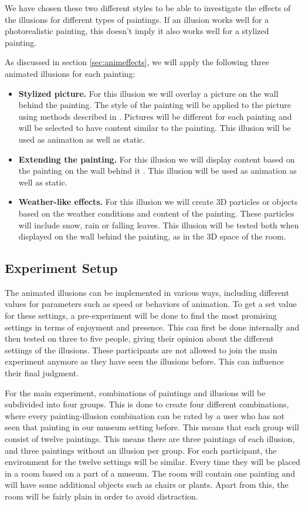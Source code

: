 \documentclass[a4paper]{article}
\begin{document}
We have chosen these two different styles to be able to investigate the effects of the illusions for different types of paintings. If an illusion works well for a photorealistic painting, this doesn't imply it also works well for a stylized painting.

As discussed in section \ref{sec:animeffects}, we will apply the following three animated illusions for each painting:

\begin{itemize}
\item \textbf{Stylized picture.} For this illusion we will overlay a picture on the wall behind the painting. The style of the painting will be applied to the picture using methods described in \cite{gatys}. Pictures will be different for each painting and will be selected to have content similar to the painting. This illusion will be used as animation as well as static.
\item \textbf{Extending the painting.} For this illusion we will display content based on the painting on the wall behind it \cite{inpainting}. This illusion will be used as animation as well as static.
\item \textbf{Weather-like effects.} For this illusion we will create 3D particles or objects based on the weather conditions and content of the painting. These particles will include snow, rain or falling leaves. This illusion will be tested both when displayed on the wall behind the painting, as in the 3D space of the room.
\end{itemize}


\subsection{Experiment Setup}

The animated illusions can be implemented in various ways, including different values for parameters such as speed or behaviors of animation. To get a set value for these settings, a pre-experiment will be done to find the most promising settings in terms of enjoyment and presence. This can first be done internally and then tested on three to five people, giving their opinion about the different settings of the illusions. These participants are not allowed to join the main experiment anymore as they have seen the illusions before. This can influence their final judgment.

For the main experiment, combinations of paintings and illusions will be subdivided into four groups. This is done to create four different combinations, where every painting-illusion combination can be rated by a user who has not seen that painting in our museum setting before. This means that each group will consist of twelve paintings. This means there are three paintings of each illusion, and three paintings without an illusion per group.
For each participant, the environment for the twelve settings will be similar. Every time they will be placed in a room based on a part of a museum. The room will contain one painting and will have some additional objects such as chairs or plants. Apart from this, the room will be fairly plain in order to avoid distraction.
\end{document}
